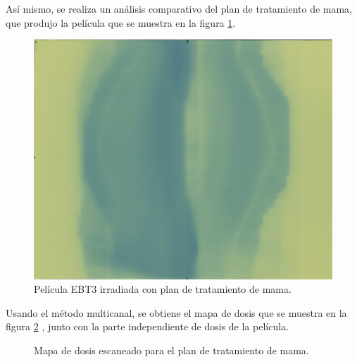 Así mismo, se realiza un análisis comparativo del plan de tratamiento de mama, que produjo la película que se muestra en la figura \ref{fig:mamaEscaneada}.\\
\begin{figure}[H]
	\centering
	\includegraphics[width=0.7\linewidth]{images/peliculaMama.png}
	\caption{Película EBT3 irradiada con plan de tratamiento de mama. }
	\label{fig:mamaEscaneada}
\end{figure}
Usando el método multicanal, se obtiene el mapa de dosis que se muestra en la figura \ref{fig:mapaMAma} , junto con la parte independiente de dosis de la película.
\begin{figure}[H]
	\centering
	\hfill
	\caption{Mapa de dosis escaneado para el plan de tratamiento de mama.}
	\label{fig:mapaMAma}
\end{figure}

